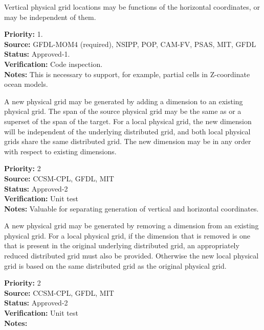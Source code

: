 Vertical physical grid locations may be functions of the horizontal coordinates, or may be
independent of them.
\begin{reqlist}
{\bf Priority:} 1. \\
{\bf Source:} GFDL-MOM4 (required), NSIPP, POP, 
              CAM-FV, PSAS, MIT, GFDL \\
{\bf Status:} Approved-1. \\
{\bf Verification:} Code inspection.\\
{\bf Notes:} This is necessary to support, for example, partial cells in
Z-coordinate ocean models.
\end{reqlist}

A new physical grid may be generated by adding a dimension to an existing 
physical grid.  The span of the source physical grid may be the same as or a superset of
the span of the target.  For a local physical grid, the new dimension will be independent 
of the underlying distributed grid, and both local physical grids share the same 
distributed grid.  The new dimension may be in any order with respect to existing dimensions.
\begin{reqlist}
{\bf Priority:} 2 \\
{\bf Source:} CCSM-CPL, GFDL, MIT \\
{\bf Status:} Approved-2 \\
{\bf Verification:} Unit test\\
{\bf Notes:} Valuable for separating generation of vertical and horizontal
coordinates.
\end{reqlist}

A new physical grid may be generated by removing a dimension from an existing physical grid.
For a local physical grid, if the dimension that is removed is one that is present 
in the original underlying distributed grid, an appropriately reduced distributed 
grid must also be provided.  Otherwise the new local physical
grid is based on the same distributed grid as the original physical grid.
\begin{reqlist}
{\bf Priority:} 2 \\
{\bf Source:} CCSM-CPL, GFDL, MIT \\
{\bf Status:} Approved-2 \\
{\bf Verification:} Unit test\\
{\bf Notes:} 
\end{reqlist}

